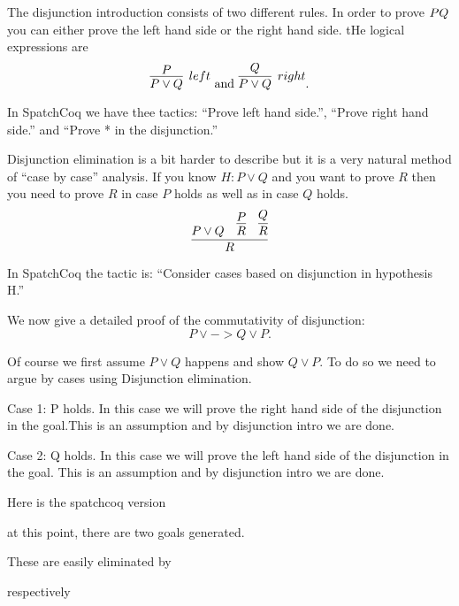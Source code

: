 \begin{itemize}
The disjunction introduction consists of two different rules. In order to prove $P\/Q$ you can either prove the left hand side or the right hand side.  tHe logical expressions are
$$\infer[left]{P\lor Q}{P} \mbox{ and } \infer[right]{P\lor Q}{Q}.$$

In SpatchCoq we have thee tactics: ``Prove left hand side.'', ``Prove right hand side.'' and 
``Prove * in the disjunction.''

Disjunction elimination is a bit harder to describe but it is a very natural method of ``case by case'' analysis. If you know $H: P\lor Q$ and you  want to prove $R$ then you need to prove $R$ in case $P$ holds as well as in case $Q$ holds.
$$\infer{R}{P\lor Q &\infer{R}{P} & \infer{R}{Q}}$$

In SpatchCoq the tactic is: ``Consider cases based on disjunction in hypothesis H.''

We now give a detailed proof of the commutativity of disjunction:
$$P\lor ->Q\lor P.$$ 

Of course we first assume $P\lor Q$ happens and show $Q \lor P$. To do so we need to argue by cases using Disjunction elimination.

Case 1: P holds. In this case we will prove the right hand side of the disjunction in the goal.This is an assumption and by disjunction intro we are done.

Case 2: Q holds. In this case we will prove the left hand side of the disjunction in the goal. This is an assumption  and by disjunction intro we are done.

Here is the spatchcoq version


at this point, there are two goals generated.


These are easily eliminated by

respectively 




\end{itemize}
